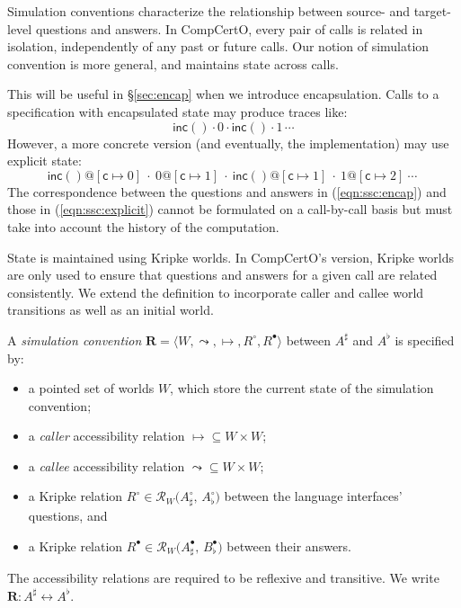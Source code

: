 \documentclass[acmsmall,screen,review,anonymous]{acmart}
\newcommand{\kw}[1]{\ensuremath{ \mathsf{#1} }}
\newcommand{\que}{\circ}
\newcommand{\ans}{\bullet}
\begin{document}
Simulation conventions
characterize the relationship between
source- and target-level
questions and answers.
In CompCertO,
every pair of calls is related in isolation,
independently of any past or future calls.
Our notion of simulation convention
is more general,
and maintains state across calls.

\begin{remark} \label{rem:base:ssc} %
This will be useful in \S\ref{sec:encap}
when we introduce encapsulation.
Calls to a specification with encapsulated state
may produce traces like:
\begin{equation} \label{eqn:ssc:encap}
  \kw{inc}() \cdot 0 \cdot \kw{inc}() \cdot 1 \,\cdots {}
\end{equation}
However, a more concrete version (and eventually, the implementation)
may use explicit state:
\begin{equation} \label{eqn:ssc:explicit}
  \kw{inc}()@[\kw{c} \mapsto 0] \:\cdot\:
  0@[\kw{c} \mapsto 1] \:\cdot\:
  \kw{inc}()@[\kw{c} \mapsto 1] \:\cdot\:
  1@[\kw{c} \mapsto 2] \:\cdots\: {}
\end{equation}
The correspondence between
the questions and answers in (\ref{eqn:ssc:encap})
and those in (\ref{eqn:ssc:explicit})
cannot be formulated on a call-by-call basis
but must take into account the history of the computation.
\end{remark}

State is maintained using Kripke worlds.
In CompCertO's version,
Kripke worlds are only used to ensure that
questions and answers for a given call
are related consistently.
We extend the definition to incorporate
caller and callee world transitions
as well as an initial world.

\begin{definition} \label{def:sconv} %
A \emph{simulation convention}
$\mathbf{R} = \langle W, {\leadsto}, {\mapsto}, R^\que, R^\ans \rangle$
between %
$A^\sharp$ and $A^\flat$
is specified by:
\begin{itemize}
  \item a pointed set of worlds $W$,
    which store the current state of the simulation convention;
  \item a \emph{caller} accessibility relation ${\mapsto} \subseteq W \times W$;
  \item a \emph{callee} accessibility relation ${\leadsto} \subseteq W \times W$;
  \item a Kripke relation $R^\que \in \mathcal{R}_W\big(A_\sharp^\que,\, A_\flat^\que\big)$
    between the language interfaces' questions, and
  \item a Kripke relation $R^\ans \in \mathcal{R}_W\big(A_\sharp^\ans,\, B_\flat^\ans\big)$
    between their answers.
\end{itemize}
The accessibility relations are required to be reflexive and transitive.
We write $\mathbf{R} : A^\sharp \leftrightarrow A^\flat$.
\end{definition}
\end{document}
